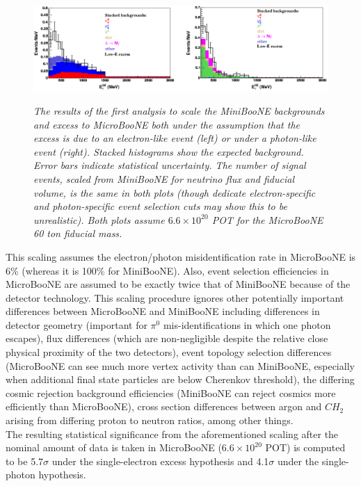 \begin{figure}[ht!]
\centering
	\includegraphics[width=1.0\textwidth]{Figures/TDR_LEE_scaling.png} \\
\caption{\textit{The results of the first analysis to scale the MiniBooNE backgrounds and excess to MicroBooNE both under the assumption that the excess is due to an electron-like event (left) or under a photon-like event (right). Stacked histograms show the expected background. Error bars indicate statistical uncertainty. The number of signal events, scaled from MiniBooNE for neutrino flux and fiducial volume, is the same in both plots (though dedicate electron-specific and photon-specific event selection cuts may show this to be unrealistic). Both plots assume $6.6 \times 10^20$ POT for the MicroBooNE 60 ton fiducial mass.}}\label{TDR_LEE_scaling_fig}
\end{figure}


This scaling assumes the electron/photon misidentification rate in MicroBooNE is 6\% (whereas it is 100\% for MiniBooNE). Also, event selection efficiencies in MicroBooNE are assumed to be exactly twice that of MiniBooNE because of the detector technology. This scaling procedure ignores other potentially important differences between MicroBooNE and MiniBooNE including differences in detector geometry (important for $\pi^0$ mis-identifications in which one photon escapes), flux differences (which are non-negligible despite the relative close physical proximity of the two detectors), event topology selection differences (MicroBooNE can see much more vertex activity than can MiniBooNE, especially when additional final state particles are below Cherenkov threshold), the differing cosmic rejection background efficiencies (MiniBooNE can reject cosmics more efficiently than MicroBooNE), cross section differences between argon and $CH_2$ arising from differing proton to neutron ratios, among other things.\\%

The resulting statistical significance from the aforementioned scaling after the nominal amount of data is taken in MicroBooNE ($6.6\times 10^{20}$ POT) is computed to be 5.7$\sigma$ under the single-electron excess hypothesis and 4.1$\sigma$ under the single-photon hypothesis. \\

